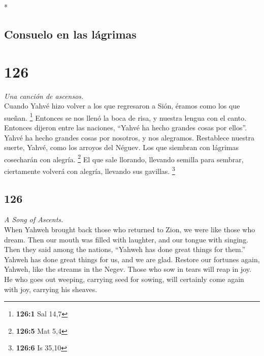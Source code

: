 \begin{paracol}{2}
\begin{otherlanguage}{english}
\end{otherlanguage}

\switchcolumn[0]*

\hypertarget{consuelo-en-las-luxe1grimas}{%
\subsection{Consuelo en las
lágrimas}\label{consuelo-en-las-luxe1grimas}}

\hypertarget{section-250}{%
\section{126}\label{section-250}}

\emph{Una canción de ascensos.}\\
 Cuando Yahvé hizo volver a los que regresaron a Sión,
éramos como los que sueñan. \footnote{\textbf{126:1} Sal 14,7}
 Entonces se nos llenó la boca de risa, y nuestra lengua
con el canto. Entonces dijeron entre las naciones, ``Yahvé ha hecho
grandes cosas por ellos''.  Yahvé ha hecho grandes cosas
por nosotros, y nos alegramos.  Restablece nuestra suerte,
Yahvé, como los arroyos del Néguev.  Los que siembran con
lágrimas cosecharán con alegría. \footnote{\textbf{126:5} Mat 5,4}
 El que sale llorando, llevando semilla para sembrar,
ciertamente volverá con alegría, llevando sus gavillas. \footnote{\textbf{126:6}
  Is 35,10}

\switchcolumn
\begin{otherlanguage}{english}

\hypertarget{section-251}{%
\section{126}\label{section-251}}

\emph{A Song of Ascents.}\\
 When Yahweh brought back those who returned to Zion, we
were like those who dream.  Then our mouth was filled with
laughter, and our tongue with singing. Then they said among the nations,
``Yahweh has done great things for them.''  Yahweh has
done great things for us, and we are glad.  Restore our
fortunes again, Yahweh, like the streams in the Negev. 
Those who sow in tears will reap in joy.  He who goes out
weeping, carrying seed for sowing, will certainly come again with joy,
carrying his sheaves.


\end{otherlanguage}
\end{paracol}
